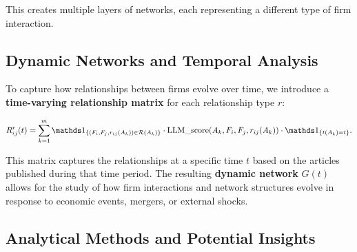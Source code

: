 This creates multiple layers of networks, each representing a different type of firm interaction.



\subsection{Dynamic Networks and Temporal Analysis}

To capture how relationships between firms evolve over time, we introduce a \textbf{time-varying relationship matrix} for each relationship type $ r $:

$$
R^r_{ij}(t) = \sum_{k=1}^{m} \I{(F_i, F_j, r_{ij}(A_k)) \in \mathcal{R}(A_k)} \cdot \text{LLM\_score}(A_k, F_i, F_j, r_{ij}(A_k)) \cdot \I{t(A_k) = t}.
$$

This matrix captures the relationships at a specific time $ t $ based on the articles published during that time period. The resulting \textbf{dynamic network} $ G(t) $ allows for the study of how firm interactions and network structures evolve in response to economic events, mergers, or external shocks.

\subsection{Analytical Methods and Potential Insights}

